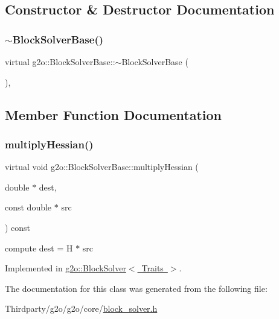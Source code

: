 \subsection{Constructor \& Destructor Documentation}
\mbox{\label{classg2o_1_1_block_solver_base_a59aabc7d24599a7f7b251cc0040bcb0a}} 
\subsubsection{\texorpdfstring{$\sim$\+Block\+Solver\+Base()}{~BlockSolverBase()}}
{\footnotesize\ttfamily virtual g2o\+::\+Block\+Solver\+Base\+::$\sim$\+Block\+Solver\+Base (\begin{DoxyParamCaption}{ }\end{DoxyParamCaption})\hspace{0.3cm}{\ttfamily [inline]}, {\ttfamily [virtual]}}



\subsection{Member Function Documentation}
\mbox{\label{classg2o_1_1_block_solver_base_a4ff7072751bfa1b7fcf91f8219e18e13}} 
\subsubsection{\texorpdfstring{multiply\+Hessian()}{multiplyHessian()}}
{\footnotesize\ttfamily virtual void g2o\+::\+Block\+Solver\+Base\+::multiply\+Hessian (\begin{DoxyParamCaption}\item[{double $\ast$}]{dest,  }\item[{const double $\ast$}]{src }\end{DoxyParamCaption}) const\hspace{0.3cm}{\ttfamily [pure virtual]}}

compute dest = H $\ast$ src 

Implemented in \mbox{\hyperlink{classg2o_1_1_block_solver_a6eb8f0729e8bcd760e629421cfa7202c}{g2o\+::\+Block\+Solver$<$ Traits $>$}}.



The documentation for this class was generated from the following file\+:\begin{DoxyCompactItemize}
\item 
Thirdparty/g2o/g2o/core/\mbox{\hyperlink{block__solver_8h}{block\+\_\+solver.\+h}}\end{DoxyCompactItemize}
